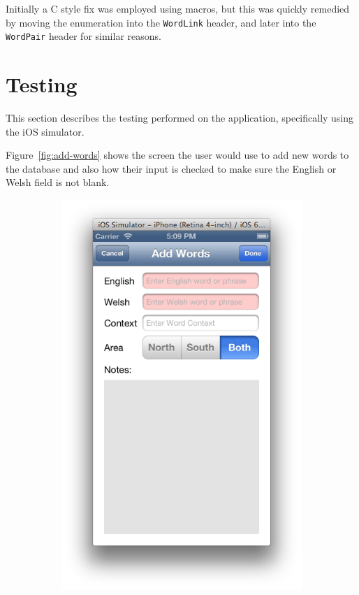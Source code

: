 \documentclass[11pt, a4paper]{article}
\begin{document}
Initially a C style fix was employed using macros, but this was quickly remedied by moving the enumeration into the \texttt{WordLink} header, and later into the \texttt{WordPair} header for similar reasons.


\section{Testing}

This section describes the testing performed on the application, specifically using the iOS simulator.

Figure~\ref{fig:add-words} shows the screen the user would use to add new words to the database and also how their input is checked to make sure the English or Welsh field is not blank.

\begin{figure}[h]
\centering
\begin{subfigure}[b]{0.3\textwidth}
\includegraphics[width=\textwidth]{img/add-word-init}

\end{subfigure}
\end{figure}
\end{document}
